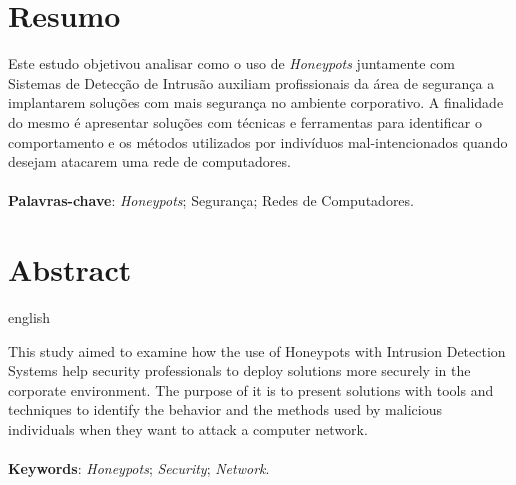 \documentclass[article,12pt,oneside,a4paper,english,brazil]{unifil}
\date{}
\begin{document}
\frenchspacing
\maketitle
\normalsize

\fontsize{10}{1}\selectfont
\section*{Resumo}
Este estudo objetivou analisar como o uso de \textit{Honeypots} juntamente com Sistemas de Detecção de Intrusão auxiliam profissionais da área de segurança a implantarem soluções com mais segurança no ambiente corporativo. A finalidade do mesmo é apresentar soluções com técnicas e ferramentas para identificar o comportamento e os métodos utilizados por indivíduos mal-intencionados quando desejam atacarem uma rede de computadores.\\
\vspace{\onelineskip} \\
\noindent
\textbf{Palavras-chave}: \textit{Honeypots}; Segurança; Redes de Computadores.



\section*{Abstract}
\begin{otherlanguage*}{english}

This study aimed to examine how the use of Honeypots with Intrusion Detection Systems help security professionals to deploy solutions more securely in the corporate environment. The purpose of it is to present solutions with tools and techniques to identify the behavior and the methods used by malicious individuals when they want to attack a computer network.\\
\vspace{\onelineskip}\\
\noindent
\textbf{Keywords}: \textit{Honeypots}; \textit{Security}; \textit{Network}.
\end{otherlanguage*}
\end{document}
